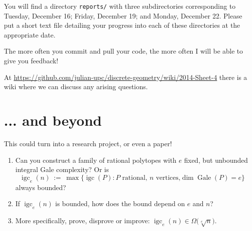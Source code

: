 \documentclass[11pt]{amsart}
\DeclareMathOperator{\igc}{igc}
\DeclareMathOperator{\Gale}{Gale}
\begin{document}
\medskip
You will find a directory \texttt{reports/} with three subdirectories corresponding to Tuesday, December 16; Friday, December 19; and Monday, December 22. Please put a short text file detailing your progress into each of these directories at the appropriate date.

\medskip
The more often you commit and pull your code, the more often I will be able to give you feedback!

\medskip
At \url{https://github.com/julian-upc/discrete-geometry/wiki/2014-Sheet-4} there is a wiki where we can discuss any arising questions. 

\section*{... and beyond}

This could turn into a research project, or even a paper! 

\begin{enumerate}
\item Can you construct a family of rational polytopes with $e$ fixed, but unbounded integral Gale complexity? Or is 
\[ 
   \igc_e(n)
   \ := \
   \max\big\{\igc(P) : P \text{ rational, $n$ vertices,}\dim\Gale(P)=e\big\}
\]
always bounded? 
\item If $\igc_e(n)$ is bounded, how does the bound depend on $e$ and $n$? 
\item More specifically, prove, disprove or improve: $\igc_e(n)\in\Omega\big(\sqrt[e]{n}\big)$.
\end{enumerate}
\end{document}
